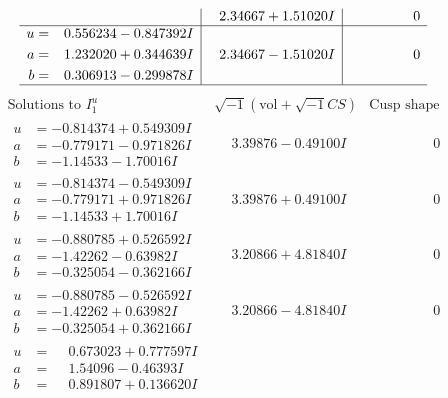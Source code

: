 \documentclass[1p]{elsarticle_modified}
\theoremstyle{definition}
\newcommand{\I}{\sqrt{-1}}
\begin{document}
$$\begin{array}{c|c|c}
 & \phantom{-}2.34667 + 1.51020 I & \phantom{-0.000000 } 0 \\ \hline\begin{aligned}
u &= \phantom{-}0.556234 - 0.847392 I \\
a &= \phantom{-}1.232020 + 0.344639 I \\
b &= \phantom{-}0.306913 - 0.299878 I\end{aligned}
 & \phantom{-}2.34667 - 1.51020 I & \phantom{-0.000000 } 0\\
 \hline 
 \end{array}$$\newpage$$\begin{array}{c|c|c}  
\text{Solutions to }I^u_{1}& \I (\text{vol} + \sqrt{-1}CS) & \text{Cusp shape}\\
 \hline 
\begin{aligned}
u &= -0.814374 + 0.549309 I \\
a &= -0.779171 - 0.971826 I \\
b &= -1.14533 - 1.70016 I\end{aligned}
 & \phantom{-}3.39876 - 0.49100 I & \phantom{-0.000000 } 0 \\ \hline\begin{aligned}
u &= -0.814374 - 0.549309 I \\
a &= -0.779171 + 0.971826 I \\
b &= -1.14533 + 1.70016 I\end{aligned}
 & \phantom{-}3.39876 + 0.49100 I & \phantom{-0.000000 } 0 \\ \hline\begin{aligned}
u &= -0.880785 + 0.526592 I \\
a &= -1.42262 - 0.63982 I \\
b &= -0.325054 - 0.362166 I\end{aligned}
 & \phantom{-}3.20866 + 4.81840 I & \phantom{-0.000000 } 0 \\ \hline\begin{aligned}
u &= -0.880785 - 0.526592 I \\
a &= -1.42262 + 0.63982 I \\
b &= -0.325054 + 0.362166 I\end{aligned}
 & \phantom{-}3.20866 - 4.81840 I & \phantom{-0.000000 } 0 \\ \hline\begin{aligned}
u &= \phantom{-}0.673023 + 0.777597 I \\
a &= \phantom{-}1.54096 - 0.46393 I \\
b &= \phantom{-}0.891807 + 0.136620 I\end{aligned}

\end{array}$$
\end{document}
